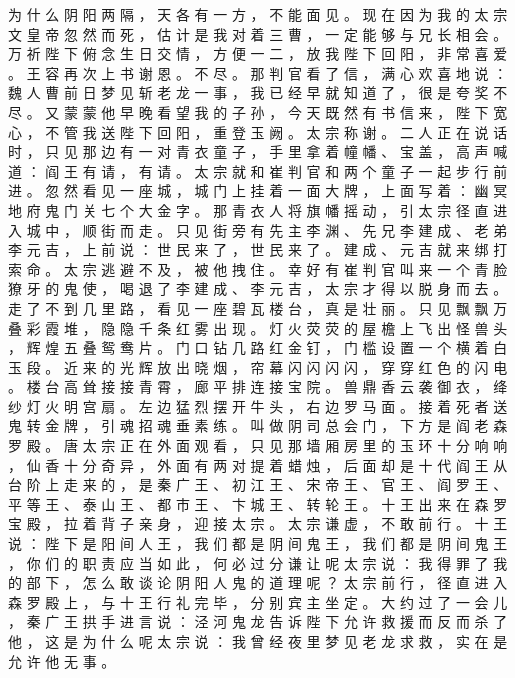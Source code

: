 {为 什 么 阴 阳 两 隔 ， 天 各 有 一 方 ， 不 能 面 见 。
现 在 因 为 我 的 太 宗 文 皇 帝 忽 然 而 死 ， 估 计 是 我 对 着 三 曹 ， 一 定 能 够 与 兄 长 相 会 。
万 祈 陛 下 俯 念 生 日 交 情 ， 方 便 一 二 ， 放 我 陛 下 回 阳 ， 非 常 喜 爱 。
王 容 再 次 上 书 谢 恩 。
不 尽 。
那 判 官 看 了 信 ， 满 心 欢 喜 地 说 ： 魏 人 曹 前 日 梦 见 斩 老 龙 一 事 ， 我 已 经 早 就 知 道 了 ， 很 是 夸 奖 不 尽 。
又 蒙 蒙 他 早 晚 看 望 我 的 子 孙 ， 今 天 既 然 有 书 信 来 ， 陛 下 宽 心 ， 不 管 我 送 陛 下 回 阳 ， 重 登 玉 阙 。
太 宗 称 谢 。
二 人 正 在 说 话 时 ， 只 见 那 边 有 一 对 青 衣 童 子 ， 手 里 拿 着 幢 幡 、 宝 盖 ， 高 声 喊 道 ： 阎 王 有 请 ， 有 请 。
太 宗 就 和 崔 判 官 和 两 个 童 子 一 起 步 行 前 进 。
忽 然 看 见 一 座 城 ， 城 门 上 挂 着 一 面 大 牌 ， 上 面 写 着 ： 幽 冥 地 府 鬼 门 关 七 个 大 金 字 。
那 青 衣 人 将 旗 幡 摇 动 ， 引 太 宗 径 直 进 入 城 中 ， 顺 街 而 走 。
只 见 街 旁 有 先 主 李 渊 、 先 兄 李 建 成 、 老 弟 李 元 吉 ， 上 前 说 ： 世 民 来 了 ， 世 民 来 了 。
建 成 、 元 吉 就 来 绑 打 索 命 。
太 宗 逃 避 不 及 ， 被 他 拽 住 。
幸 好 有 崔 判 官 叫 来 一 个 青 脸 獠 牙 的 鬼 使 ， 喝 退 了 李 建 成 、 李 元 吉 ， 太 宗 才 得 以 脱 身 而 去 。
走 了 不 到 几 里 路 ， 看 见 一 座 碧 瓦 楼 台 ， 真 是 壮 丽 。
只 见 飘 飘 万 叠 彩 霞 堆 ， 隐 隐 千 条 红 雾 出 现 。
灯 火 荧 荧 的 屋 檐 上 飞 出 怪 兽 头 ， 辉 煌 五 叠 鸳 鸯 片 。
门 口 钻 几 路 红 金 钉 ， 门 槛 设 置 一 个 横 着 白 玉 段 。
近 来 的 光 辉 放 出 晓 烟 ， 帘 幕 闪 闪 闪 闪 ， 穿 穿 红 色 的 闪 电 。
楼 台 高 耸 接 接 青 霄 ， 廊 平 排 连 接 宝 院 。
兽 鼎 香 云 袭 御 衣 ， 绛 纱 灯 火 明 宫 扇 。
左 边 猛 烈 摆 开 牛 头 ， 右 边 罗 马 面 。
接 着 死 者 送 鬼 转 金 牌 ， 引 魂 招 魂 垂 素 练 。
叫 做 阴 司 总 会 门 ， 下 方 是 阎 老 森 罗 殿 。
唐 太 宗 正 在 外 面 观 看 ， 只 见 那 墙 厢 房 里 的 玉 环 十 分 响 响 ， 仙 香 十 分 奇 异 ， 外 面 有 两 对 提 着 蜡 烛 ， 后 面 却 是 十 代 阎 王 从 台 阶 上 走 来 的 ， 是 秦 广 王 、 初 江 王 、 宋 帝 王 、 官 王 、 阎 罗 王 、 平 等 王 、 泰 山 王 、 都 市 王 、 卞 城 王 、 转 轮 王 。
十 王 出 来 在 森 罗 宝 殿 ， 拉 着 背 子 亲 身 ， 迎 接 太 宗 。
太 宗 谦 虚 ， 不 敢 前 行 。
十 王 说 ： 陛 下 是 阳 间 人 王 ， 我 们 都 是 阴 间 鬼 王 ， 我 们 都 是 阴 间 鬼 王 ， 你 们 的 职 责 应 当 如 此 ， 何 必 过 分 谦 让 呢 太 宗 说 ： 我 得 罪 了 我 的 部 下 ， 怎 么 敢 谈 论 阴 阳 人 鬼 的 道 理 呢 ？
太 宗 前 行 ， 径 直 进 入 森 罗 殿 上 ， 与 十 王 行 礼 完 毕 ， 分 别 宾 主 坐 定 。
大 约 过 了 一 会 儿 ， 秦 广 王 拱 手 进 言 说 ： 泾 河 鬼 龙 告 诉 陛 下 允 许 救 援 而 反 而 杀 了 他 ， 这 是 为 什 么 呢 太 宗 说 ： 我 曾 经 夜 里 梦 见 老 龙 求 救 ， 实 在 是 允 许 他 无 事 。
}
